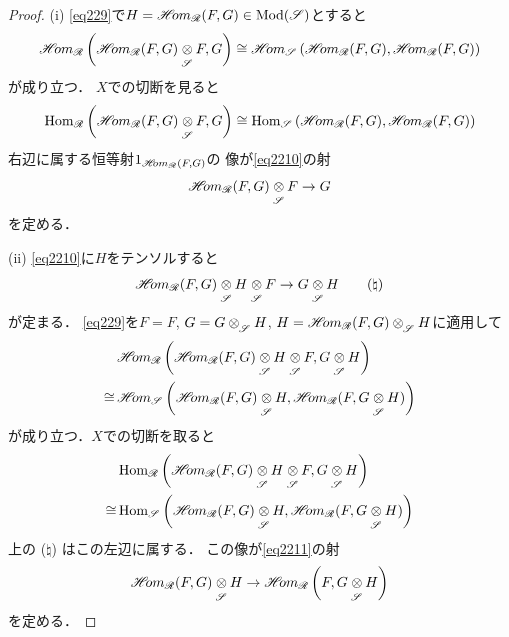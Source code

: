 \begin{proof}
    (i) 
    \eqref{eq229}で\(H=\mathop{\mathscr{H}\hspace{-2pt}om}\nolimits_{\mathscr{R}}(F,G)\in\mathop{\mathrm{Mod}}\nolimits(\mathscr{S})\)とすると
    \[
        \HOM_{\scR}\left(\HOM_{\scR}(F,G)\ttens[\scS]F,G\right)
        \cong
        \HOM_{\scS}\left(\HOM_{\scR}(F,G),\HOM_{\scR}(F,G)\right)
    \]
    が成り立つ．
    \(X\)での切断を見ると
    \[
        \Hom_{\scR}\left(\HOM_{\scR}(F,G)\ttens[\scS]F,G\right)
        \cong
        \Hom_{\scS}\left(\HOM_{\scR}(F,G),\HOM_{\scR}(F,G)\right)
    \]
    右辺に属する恒等射\(1_{\mathop{\mathscr{H}\hspace{-2pt}om}\nolimits_{\mathscr{R}}(F,G)}\)の
    像が\eqref{eq2210}の射\[
        \HOM_{\scR}(F,G)\ttens[\scS]F\to G
    \]を定める．

    (ii) 
    \eqref{eq2210}に\(H\)をテンソルすると
    \[
        \HOM_{\scR}(F,G)\ttens[\scS]H\ttens[\scS]F\to G\ttens[\scS]H\tag*{(\(\natural\))}
    \]
    が定まる．
    \eqref{eq229}を\(F=F\), \(G=G\ttens[\scS]H\), 
    \(H=\HOM_{\scR}(F,G)\ttens[\scS]H\)に適用して
    \begin{align*}
        &\HOM_{\scR}\left(\HOM_{\scR}(F,G)\ttens[\scS]H\ttens[\scS]F,G\ttens[\scS]H\right)\\
        \cong
        &\HOM_{\scS}\left(\HOM_{\scR}(F,G)\ttens[\scS]H,\HOM_{\scR}(F,G\ttens[\scS]H)\right)
    \end{align*}
    が成り立つ．\(X\)での切断を取ると
    \begin{align*}
        &\Hom_{\scR}\left(\HOM_{\scR}(F,G)\ttens[\scS]H\ttens[\scS]F,G\ttens[\scS]H\right)\\
        \cong
        &\Hom_{\scS}\left(\HOM_{\scR}(F,G)\ttens[\scS]H,\HOM_{\scR}(F,G\ttens[\scS]H)\right)
    \end{align*}
    上の (\(\natural\)) はこの左辺に属する．
    この像が\eqref{eq2211}の射\[
        \HOM_{\scR}(F,G)\ttens[\scS]H
        \to
        \HOM_{\scR}\left(F,G\ttens[\scS]H\right)
    \]
    を定める．


\end{proof}

